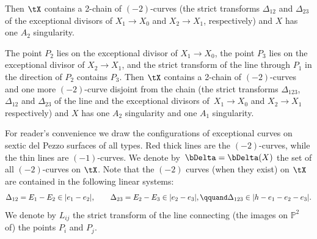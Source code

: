 \documentclass[11pt]{amsart}
\renewcommand{\P}{{\mathbb{P}}}
\theoremstyle{plain}
\theoremstyle{definition}
\theoremstyle{remark}
\begin{document}
\begin{description}
Then $\tX$ contains a 2-chain of $(-2)$-curves 
(the strict transforms $\Delta_{12}$ and $\Delta_{23}$ of the exceptional divisors of $X_1 \to X_0$ and $X_2 \to X_1$, respectively) 
and $X$ has one $A_2$ singularity.
\item[Type 5] 
The point $P_2$ lies on the exceptional divisor of $X_1 \to X_0$, the point $P_3$ lies on the exceptional divisor of $X_2 \to X_1$, 
and the strict transform of the line through $P_1$ in the direction of $P_2$ contains $P_3$.
Then $\tX$ contains a 2-chain of $(-2)$-curves and one more $(-2)$-curve disjoint from the chain (the strict transforms $\Delta_{123}$, $\Delta_{12}$ and $\Delta_{23}$ of the line 
and the exceptional divisors of~$X_1 \to X_0$ and $X_2 \to X_1$ respectively) and $X$ has one $A_2$ singularity and one $A_1$ singularity.
\end{description}

For reader's convenience we draw the configurations of exceptional curves on sextic del Pezzo surfaces of all types. 
Red thick lines are the $(-2)$-curves, while the thin lines are $(-1)$-curves. 
We denote by~$\bDelta = \bDelta(X)$ the set of all $(-2)$-curves on $\tX$. 
Note that the $(-2)$ curves (when they exist) on $\tX$ are contained in the following linear systems:
\begin{equation*}
\Delta_{12} = E_1 - E_2 \in |e_1 - e_2|,
\qquad 
\Delta_{23} = E_2 - E_3 \in |e_2 - e_3|,
\qquand
\Delta_{123} \in |h - e_1 - e_2 - e_3|.
\end{equation*}
We denote by $L_{ij}$ the strict transform of the line connecting (the images on $\P^2$ of) the points $P_i$ and $P_j$.
\end{document}
